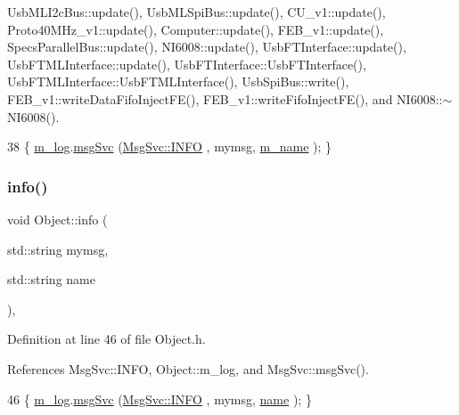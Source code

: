Usb\+M\+L\+I2c\+Bus\+::update(), Usb\+M\+L\+Spi\+Bus\+::update(), C\+U\+\_\+v1\+::update(), Proto40\+M\+Hz\+\_\+v1\+::update(), Computer\+::update(), F\+E\+B\+\_\+v1\+::update(), Specs\+Parallel\+Bus\+::update(), N\+I6008\+::update(), Usb\+F\+T\+Interface\+::update(), Usb\+F\+T\+M\+L\+Interface\+::update(), Usb\+F\+T\+Interface\+::\+Usb\+F\+T\+Interface(), Usb\+F\+T\+M\+L\+Interface\+::\+Usb\+F\+T\+M\+L\+Interface(), Usb\+Spi\+Bus\+::write(), F\+E\+B\+\_\+v1\+::write\+Data\+Fifo\+Inject\+F\+E(), F\+E\+B\+\_\+v1\+::write\+Fifo\+Inject\+F\+E(), and N\+I6008\+::$\sim$\+N\+I6008().


\begin{DoxyCode}
38 \{ \hyperlink{classObject_a0d269813dd7ac1f24bc143031e2963f2}{m\_log}.\hyperlink{classMsgSvc_ad25f18047920cc59a314e5098259711c}{msgSvc} (\hyperlink{classMsgSvc_ae671eb7301996cd049d2da8a65925926ad2fcf3f3e734fc41ee097cc23670ce51}{MsgSvc::INFO}    , mymsg, \hyperlink{classObject_a8b83c95c705d2c3ba0d081fe1710f48d}{m\_name} ); \}
\end{DoxyCode}
\mbox{\label{classObject_a1ca123253dfd30fc28b156f521dcbdae}} 
\subsubsection{\texorpdfstring{info()}{info()}\hspace{0.1cm}{\footnotesize\ttfamily [2/2]}}
{\footnotesize\ttfamily void Object\+::info (\begin{DoxyParamCaption}\item[{std\+::string}]{mymsg,  }\item[{std\+::string}]{name }\end{DoxyParamCaption})\hspace{0.3cm}{\ttfamily [inline]}, {\ttfamily [inherited]}}



Definition at line 46 of file Object.\+h.



References Msg\+Svc\+::\+I\+N\+FO, Object\+::m\+\_\+log, and Msg\+Svc\+::msg\+Svc().


\begin{DoxyCode}
46 \{ \hyperlink{classObject_a0d269813dd7ac1f24bc143031e2963f2}{m\_log}.\hyperlink{classMsgSvc_ad25f18047920cc59a314e5098259711c}{msgSvc} (\hyperlink{classMsgSvc_ae671eb7301996cd049d2da8a65925926ad2fcf3f3e734fc41ee097cc23670ce51}{MsgSvc::INFO}    , mymsg, \hyperlink{classObject_a300f4c05dd468c7bb8b3c968868443c1}{name} ); \}
\end{DoxyCode}
\mbox{\label{classICECALv3_abf7281fad80b80b70c5b13ce66ba3451}} 
